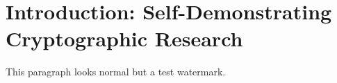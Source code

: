 \chapter{Introduction: Self-Demonstrating Cryptographic Research}
\label{chap:introduction}

This paragraph looks normal but  a test watermark.

